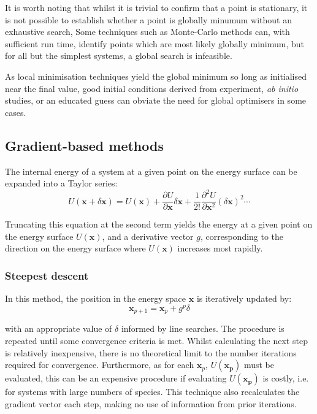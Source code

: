 It is worth noting that whilst it is trivial to confirm that a point is stationary, it is not possible to establish whether a point is globally minumum without an exhaustive search,
Some techniques such as Monte-Carlo methods can, with sufficient run time, identify points which are most likely globally minimum, but for all but the simplest systems, a global search is infeasible.\cite{Barnes1992}


As local minimisation techniques yield the global minimum so long as initialised near the final value, good initial conditions derived from experiment, \textit{ab initio} studies, or an educated guess can obviate the need for global optimisers in some cases.

\subsection{Gradient-based methods}

The internal energy of a system at a given point on the energy surface can be expanded into a Taylor series:
\begin{equation}
\label{eq:taylor}
  U(\mathbf{x}+\delta \mathbf{x}) = U(\mathbf{x}) + \frac{\partial U}{\partial \mathbf{x}} \delta \mathbf{x} + \frac{1}{2!} \frac{\partial ^2 U}{\partial \mathbf{x}^2}(\delta \mathbf{x})^2 \cdots
\end{equation}

Truncating this equation at the second term yields the energy at a given point on the energy surface $U(\mathbf{x})$, and a derivative vector $g$, corresponding to the direction on the energy surface where $U(\mathbf{x})$ increases most rapidly.

\subsubsection{Steepest descent}
In this method, the position in the energy space $\mathbf{x}$ is iteratively updated by:
\begin{equation}
\mathbf{x}_{p+1} = \mathbf{x}_p + g^p\delta
\end{equation}

with an appropriate value of $\delta$ informed by line searches.
The procedure is repeated until some convergence criteria is met.
Whilst calculating the next step is relatively inexpensive, there is no theoretical limit to the number iterations required for convergence.
Furthermore, as for each $\mathbf{x}_p$, $U(\mathbf{x_p})$ must be evaluated, this can be an expensive procedure if evaluating $U(\mathbf{x_p})$ is costly, i.e. for systems with large numbers of species.
This technique also recalculates the gradient vector each step, making no use of information from prior iterations.

